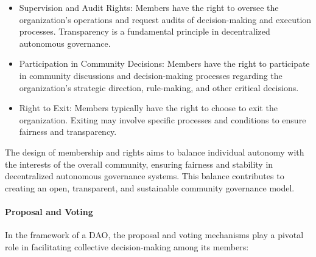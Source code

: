 \documentclass[lettersize,journal]{IEEEtran}
\begin{document}
\begin{itemize}
\begin{itemize}
    \item Supervision and Audit Rights: Members have the right to oversee the organization's operations and request audits of decision-making and execution processes. Transparency is a fundamental principle in decentralized autonomous governance.
    \item Participation in Community Decisions: Members have the right to participate in community discussions and decision-making processes regarding the organization's strategic direction, rule-making, and other critical decisions.
    \item Right to Exit: Members typically have the right to choose to exit the organization. Exiting may involve specific processes and conditions to ensure fairness and transparency.
  \end{itemize}
\end{itemize}

The design of membership and rights aims to balance individual autonomy with the interests of the overall community, ensuring fairness and stability in decentralized autonomous governance systems. This balance contributes to creating an open, transparent, and sustainable community governance model.

\paragraph{Proposal and Voting}
In the framework of a DAO, the proposal and voting mechanisms play a pivotal role in facilitating collective decision-making among its members:
\end{document}
